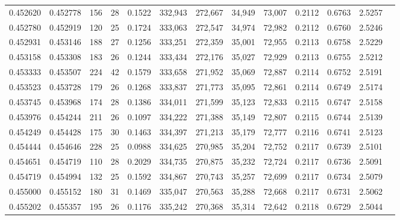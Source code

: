 \begin{tabular}{rrrrrrrrrrrrr}
0.452620 & 0.452778 &    156 &    28 &                                     0.1522 & 332,943 & 272,667 &  34,949 &  73,007 & 0.2112 & 0.6763 & 2.5257 \\
0.452780 & 0.452919 &    120 &    25 &                                     0.1724 & 333,063 & 272,547 &  34,974 &  72,982 & 0.2112 & 0.6760 & 2.5246 \\
0.452931 & 0.453146 &    188 &    27 &                                     0.1256 & 333,251 & 272,359 &  35,001 &  72,955 & 0.2113 & 0.6758 & 2.5229 \\
0.453158 & 0.453308 &    183 &    26 &                                     0.1244 & 333,434 & 272,176 &  35,027 &  72,929 & 0.2113 & 0.6755 & 2.5212 \\
0.453333 & 0.453507 &    224 &    42 &                                     0.1579 & 333,658 & 271,952 &  35,069 &  72,887 & 0.2114 & 0.6752 & 2.5191 \\
0.453523 & 0.453728 &    179 &    26 &                                     0.1268 & 333,837 & 271,773 &  35,095 &  72,861 & 0.2114 & 0.6749 & 2.5174 \\
0.453745 & 0.453968 &    174 &    28 &                                     0.1386 & 334,011 & 271,599 &  35,123 &  72,833 & 0.2115 & 0.6747 & 2.5158 \\
0.453976 & 0.454244 &    211 &    26 &                                     0.1097 & 334,222 & 271,388 &  35,149 &  72,807 & 0.2115 & 0.6744 & 2.5139 \\
0.454249 & 0.454428 &    175 &    30 &                                     0.1463 & 334,397 & 271,213 &  35,179 &  72,777 & 0.2116 & 0.6741 & 2.5123 \\
0.454444 & 0.454646 &    228 &    25 &                                     0.0988 & 334,625 & 270,985 &  35,204 &  72,752 & 0.2117 & 0.6739 & 2.5101 \\
0.454651 & 0.454719 &    110 &    28 &                                     0.2029 & 334,735 & 270,875 &  35,232 &  72,724 & 0.2117 & 0.6736 & 2.5091 \\
0.454719 & 0.454994 &    132 &    25 &                                     0.1592 & 334,867 & 270,743 &  35,257 &  72,699 & 0.2117 & 0.6734 & 2.5079 \\
0.455000 & 0.455152 &    180 &    31 &                                     0.1469 & 335,047 & 270,563 &  35,288 &  72,668 & 0.2117 & 0.6731 & 2.5062 \\
0.455202 & 0.455357 &    195 &    26 &                                     0.1176 & 335,242 & 270,368 &  35,314 &  72,642 & 0.2118 & 0.6729 & 2.5044 \\

\end{tabular}
